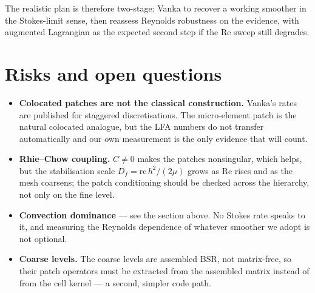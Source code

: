 \documentclass[11pt,a4paper]{article}
\newcommand{\Rey}{\mathrm{Re}}
\begin{document}
The realistic plan is therefore two-stage: Vanka to recover a working smoother in the
Stokes-limit sense, then reassess Reynolds robustness on the evidence, with augmented
Lagrangian as the expected second step if the Re sweep still degrades.

\section{Risks and open questions}
\begin{itemize}[leftmargin=*]
\item \textbf{Colocated patches are not the classical construction.} Vanka's rates are
published for staggered discretisations. The micro-element patch is the natural colocated
analogue, but the LFA numbers do not transfer automatically and our own measurement is the
only evidence that will count.
\item \textbf{Rhie--Chow coupling.} $C \neq 0$ makes the patches nonsingular, which helps, but
the stabilisation scale $D_f = \text{rc}\,h^2/(2\mu)$ grows as $\Rey$ rises and as the mesh
coarsens; the patch conditioning should be checked across the hierarchy, not only on the fine
level.
\item \textbf{Convection dominance} --- see the section above. No Stokes rate speaks to it,
and measuring the Reynolds dependence of whatever smoother we adopt is not optional.
\item \textbf{Coarse levels.} The coarse levels are assembled BSR, not matrix-free, so their
patch operators must be extracted from the assembled matrix instead of from the cell kernel ---
a second, simpler code path.
\end{itemize}
\end{document}
